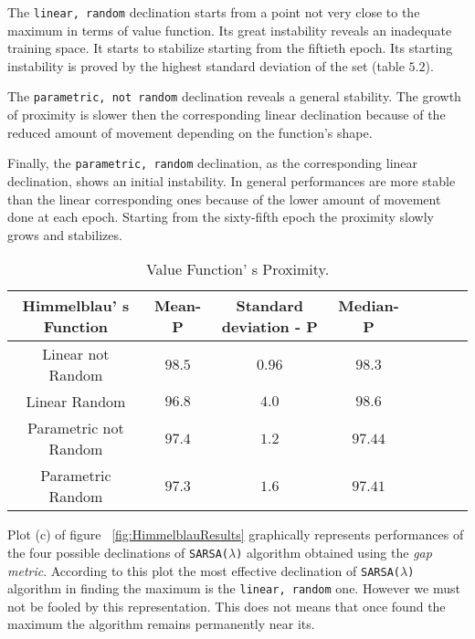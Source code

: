 The {\tt linear, random} declination starts from a point not very close to the maximum in terms of value function. Its great instability reveals an inadequate training space. It starts to stabilize starting from the fiftieth epoch. Its starting instability is proved by the highest standard deviation of the set (table $5.2$).

The {\tt parametric, not random} declination reveals a general stability. The growth of proximity is slower then the corresponding linear declination because of the reduced amount of movement depending on the function's shape. 

Finally, the {\tt parametric, random} declination, as the corresponding linear declination, shows an initial instability. In general performances are more stable than the linear corresponding ones because of the lower amount of movement done at each epoch. Starting from the sixty-fifth epoch the proximity slowly grows and stabilizes. \\

\begin{table} [h!]
	\centering
	\resizebox{\linewidth}{!} {
	\begin{tabular}{c| ccccccc} 
		\hline \textbf{Himmelblau' s Function}
		& \textbf{Mean- P} & \textbf{Standard deviation - P}  &\textbf{Median- P} \\ 
		\hline Linear not Random
		& \cellcolor{green!25}$98.5$ & \cellcolor{green!25}$0.96$ & $98.3$  \\ 
		\hline Linear Random
		& $96.8$ & $4.0$ & \cellcolor{green!25}$98.6$ \\ 
		\hline Parametric not Random
		& $97.4$ & $1.2$ & $97.44$ \\ 
		\hline Parametric Random
		& $97.3$ & $1.6$ & $97.41$ \\ 
		\hline 
	\end{tabular}
}
\label{HimmelblauTabProximity}
\caption{Value Function' s Proximity.} 
\end{table}

Plot (c) of figure ~\ref{fig:HimmelblauResults} graphically represents performances of the four possible declinations of {\tt SARSA($\lambda$)} algorithm obtained using the \textit{gap metric}. According to this plot the most effective declination of {\tt SARSA($\lambda$)} algorithm in finding the maximum is the {\tt linear, random} one. However we must not be fooled by this representation. This does not means that once found the maximum the algorithm remains permanently near its. 


